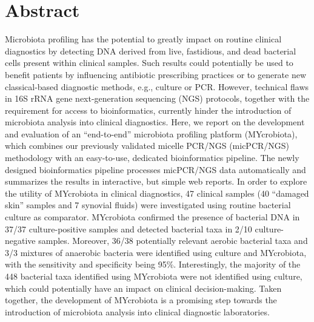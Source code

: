 \section*{Abstract}
Microbiota profiling has the potential to greatly impact on routine clinical diagnostics by detecting DNA derived from live,
fastidious, and dead bacterial cells present within clinical samples. Such results could potentially be used to benefit patients
by influencing antibiotic prescribing practices or to generate new classical-based diagnostic methods, e.g., culture or PCR\@.
However, technical flaws in 16S rRNA gene next-generation sequencing (NGS) protocols, together with the requirement for access
to bioinformatics, currently hinder the introduction of microbiota analysis into clinical diagnostics. Here, we report on the
development and evaluation of an “end-to-end” microbiota profiling platform (MYcrobiota), which combines our previously validated
micelle PCR/NGS (micPCR/NGS) methodology with an easy-to-use, dedicated bioinformatics pipeline. The newly designed bioinformatics
pipeline processes micPCR/NGS data automatically and summarizes the results in interactive, but simple web reports. In order to
explore the utility of MYcrobiota in clinical diagnostics, 47 clinical samples (40 “damaged skin” samples and 7 synovial fluids)
were investigated using routine bacterial culture as comparator. MYcrobiota confirmed the presence of bacterial DNA in 37/37
culture-positive samples and detected bacterial taxa in 2/10 culture-negative samples. Moreover, 36/38 potentially relevant
aerobic bacterial taxa and 3/3 mixtures of anaerobic bacteria were identified using culture and MYcrobiota, with the sensitivity
and specificity being 95\%. Interestingly, the majority of the 448 bacterial taxa identified using MYcrobiota were not identified
using culture, which could potentially have an impact on clinical decision-making. Taken together, the development of MYcrobiota
is a promising step towards the introduction of microbiota analysis into clinical diagnostic laboratories.

